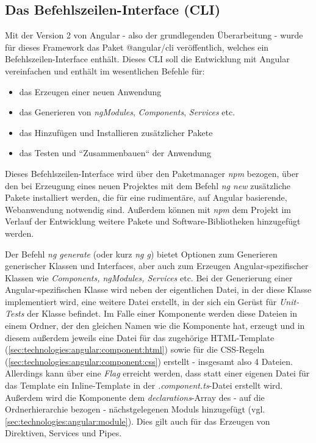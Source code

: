 \subsection{Das Befehlszeilen-Interface (CLI)}
\label{sec:technologies:angular:cli}
Mit der Version 2 von Angular - also der grundlegenden Überarbeitung - wurde für dieses Framework das Paket @angular/cli veröffentlich, welches ein Befehlszeilen-Interface enthält. Dieses \acs{CLI} soll die Entwicklung mit Angular vereinfachen und enthält im wesentlichen Befehle für:

\begin{itemize}
\item das Erzeugen einer neuen Anwendung
\item das Generieren von \textit{ngModules}, \textit{Components}, \textit{Services} etc.
\item das Hinzufügen und Installieren zusätzlicher Pakete
\item das Testen und ``Zusammenbauen`` der Anwendung
\end{itemize}

Dieses Befehlszeilen-Interface wird über den Paketmanager \textit{npm} bezogen, über den bei Erzeugung eines neuen Projektes mit dem Befehl \textit{ng new} zusätzliche Pakete installiert werden, die für eine rudimentäre, auf Angular basierende, Webanwendung notwendig sind. Außerdem können mit \textit{npm} dem Projekt im Verlauf der Entwicklung weitere Pakete und Software-Bibliotheken hinzugefügt werden.

Der Befehl \textit{ng generate} (oder kurz \textit{ng g}) bietet Optionen zum Generieren generischer Klassen und Interfaces, aber auch zum Erzeugen Angular-spezifischer Klassen wie \textit{Components, ngModules, Services} etc. Bei der Generierung einer Angular-spezifischen Klasse wird neben der eigentlichen Datei, in der diese Klasse implementiert wird, eine weitere Datei erstellt, in der sich ein Gerüst für \textit{Unit-Tests} der Klasse befindet. Im Falle einer Komponente werden diese Dateien in einem Ordner, der den gleichen Namen wie die Komponente hat, erzeugt und in diesem außerdem jeweils eine Datei für das zugehörige \acs{HTML}-Template (\ref{sec:technologies:angular:component:html}) sowie für die \acs{CSS}-Regeln (\ref{sec:technologies:angular:component:css}) erstellt - insgesamt also 4 Dateien. Allerdings kann über eine \textit{Flag} erreicht werden, dass statt einer eigenen Datei für das Template ein Inline-Template in der \textit{.component.ts}-Datei erstellt wird. Außerdem wird die Komponente dem \textit{declarations}-Array des - auf die Ordnerhierarchie bezogen - nächstgelegenen Moduls hinzugefügt (vgl. \ref{sec:technologies:angular:module}). Dies gilt auch für das Erzeugen von Direktiven, Services und Pipes.

